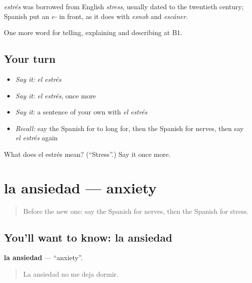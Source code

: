 \begin{cousinweb}
\emph{estrés} was borrowed from English \emph{stress}, usually dated to the twentieth century; Spanish put an \emph{e-} in front, as it does with \emph{esnob} and \emph{escáner}.
\end{cousinweb}

\begin{grammarlens}[title={What you've built}]
One more word for telling, explaining and describing at B1.
\end{grammarlens}

\subsection*{Your turn}
\begin{itemize}
\raggedright
  \item \emph{Say it:} \emph{el estrés}
  \item \emph{Say it:} \emph{el estrés}, once more
  \item \emph{Say it:} a sentence of your own with \emph{el estrés}
  \item \emph{Recall:} say the Spanish for to long for, then the Spanish for nerves, then say \emph{el estrés} again
\end{itemize}

\begin{tcolorbox}[breakable,colback=teal!4,colframe=teal!35!black,title={Before you move on}]
What does el estrés mean? (\textquotedblleft{}Stress\textquotedblright{}.) Say it once more.
\end{tcolorbox}
\section[la ansiedad]{la ansiedad — anxiety}

\label{lesson:ES-C710-ansiedad}



\begin{quote}
Before the new one: say the Spanish for nerves, then the Spanish for stress.
\end{quote}

\subsection*{You'll want to know: la ansiedad}
\textbf{la ansiedad} — \textquotedblleft{}anxiety\textquotedblright{}.

\begin{quote}
La ansiedad no me deja dormir.
\end{quote}

